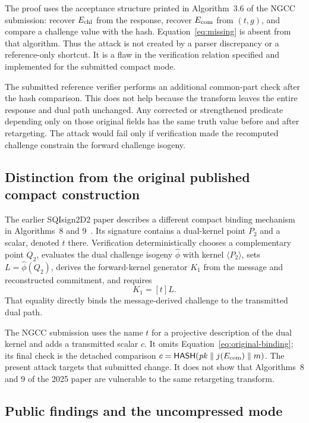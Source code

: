 \documentclass[11pt,a4paper]{article}
\newcommand{\Hash}{\mathsf{HASH}}
\begin{document}
The proof uses the acceptance structure printed in Algorithm~3.6 of the NGCC submission:
recover
$E_{\rm chl}$ from the response, recover $E_{\rm com}$ from $(t,g)$, and compare a challenge
value with the hash.  Equation~\eqref{eq:missing} is absent from that algorithm.  Thus the
attack is not created by a parser discrepancy or a reference-only shortcut.  It is a flaw in the
verification relation specified and implemented for the submitted compact mode.

The submitted reference verifier performs an additional common-part check after the hash
comparison.  This does not help because the transform leaves the entire response and dual path
unchanged.  Any corrected or strengthened predicate depending only on those original fields has
the same truth value before and after retargeting.  The attack would fail only if verification
made the recomputed challenge constrain the forward challenge isogeny.

\subsection{Distinction from the original published compact construction}

The earlier SQIsign2D2 paper describes a different compact binding mechanism
in Algorithms~8 and 9~\cite{sqisign2d2-eprint}.  Its signature contains a dual-kernel point
$P_2$ and a scalar, denoted $t$ there.  Verification deterministically chooses a complementary
point $Q_2$, evaluates the dual challenge isogeny $\widehat\phi$ with kernel
$\langle P_2\rangle$, sets $L=\widehat\phi(Q_2)$, derives the forward-kernel generator $K_1$
from the message and reconstructed commitment, and requires
\begin{equation}
  K_1=[t]L.                                                        \label{eq:original-binding}
\end{equation}
That equality directly binds the message-derived challenge to the transmitted dual path.

The NGCC submission uses the name $t$ for a projective description of the dual kernel and adds
a transmitted scalar $c$.  It omits Equation~\eqref{eq:original-binding}; its final check is the
detached comparison $c=\Hash(\mathit{pk}\parallel j(E_{\rm com})\parallel m)$.  The present
attack targets that submitted change.  It does not show that Algorithms~8 and 9 of the 2025
paper are vulnerable to the same retargeting transform.

\subsection{Public findings and the uncompressed mode}
\end{document}
